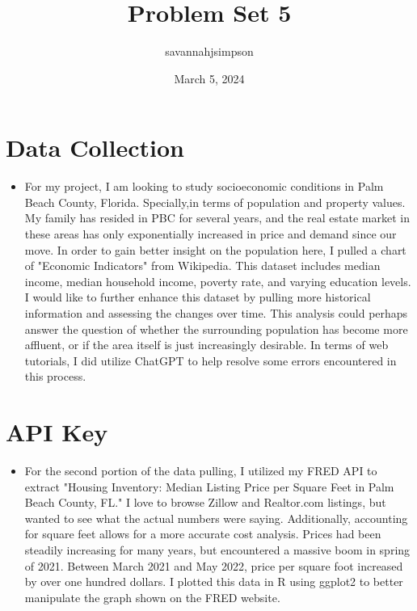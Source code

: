 \documentclass{article}
\title{Problem Set 5}
\author{savannahjsimpson }
\date{March 5, 2024}
\begin{document}
\maketitle

\section{Data Collection}

\begin{itemize}
\item For my project, I am looking to study socioeconomic conditions in Palm Beach County, Florida. Specially,in terms of population and property values. My family has resided in PBC for several years, and the real estate market in these areas has only exponentially increased in price and demand since our move. In order to gain better insight on the population here, I pulled a chart of "Economic Indicators" from Wikipedia. This dataset includes median income, median household income, poverty rate, and varying education levels. I would like to further enhance this dataset by pulling more historical information and assessing the changes over time. This analysis could perhaps answer the question of whether the surrounding population has become more affluent, or if the area itself is just increasingly desirable. In terms of web tutorials, I did utilize ChatGPT to help resolve some errors encountered in this process. 
\end{itemize}

\section{API Key}
\begin{itemize}
\item For the second portion of the data pulling, I utilized my FRED API to extract "Housing Inventory: Median Listing Price per Square Feet in Palm Beach County, FL." I love to browse Zillow and Realtor.com listings, but wanted to see what the actual numbers were saying. Additionally, accounting for square feet allows for a more accurate cost analysis. Prices had been steadily increasing for many years, but encountered a massive boom in spring of 2021. Between March 2021 and May 2022, price per square foot increased by over one hundred dollars. I plotted this data in R using ggplot2 to better manipulate the graph shown on the FRED website. 
\end{itemize}
\end{document}
